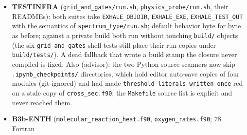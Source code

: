 \documentclass[english,a4paper]{my_memo}
\begin{document}
\begin{itemize}
  form of \texttt{lyman\_werner\_dissociation\_rate}.
\item
  \textbf{TESTINFRA} (\texttt{grid\_and\_gates/run.sh}, \texttt{physics\_probe/run.sh}, their
  READMEs): both suites take \texttt{EXHALE\_OBJDIR}, \texttt{EXHALE\_EXE}, \texttt{EXHALE\_TEST\_OUT}
  with the semantics of \texttt{spectrum\_type/run.sh}; default behavior byte for
  byte as before; against a private build both run without touching
  \texttt{build/} objects (the six \texttt{grid\_and\_gates} shell tests still place their
  run copies under \texttt{build/tests/}). A dead fallback that wrote a build stamp
  the closure never compiled is fixed. Also (advisor): the two Python source
  scanners now skip \texttt{.ipynb\_checkpoints/} directories, which hold editor
  auto-save copies of four modules (git-ignored) and had made
  \texttt{threshold\_literals\_written\_once} red on a stale copy of \texttt{cross\_sec.f90};
  the \texttt{Makefile} source list is explicit and never reached them.
\item
  \textbf{B3b-ENTH} (\texttt{molecular\_reaction\_heat.f90}, \texttt{oxygen\_rates.f90}; 78 Fortran


\end{itemize}
\end{document}

